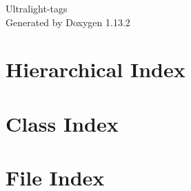 \documentclass[twoside]{book}
\newcommand{\+}{\discretionary{\mbox{\scriptsize$\hookleftarrow$}}{}{}}
\newcommand{\clearemptydoublepage}{%
    \newpage{\pagestyle{empty}\cleardoublepage}%
  }
\begin{document}
  \raggedbottom
    \hypersetup{pageanchor=false,
                bookmarksnumbered=true,
                pdfencoding=unicode
               }
  \begin{titlepage}
  \vspace*{7cm}
  \begin{center}%
  {\Large Ultralight-\/tags}\\
  \vspace*{1cm}
  {\large Generated by Doxygen 1.13.2}\\
  \end{center}
  \end{titlepage}
  \clearemptydoublepage
  \tableofcontents
  \clearemptydoublepage
  \hypersetup{pageanchor=true}
\chapter{Hierarchical Index}

\chapter{Class Index}

\chapter{File Index}

\end{document}
